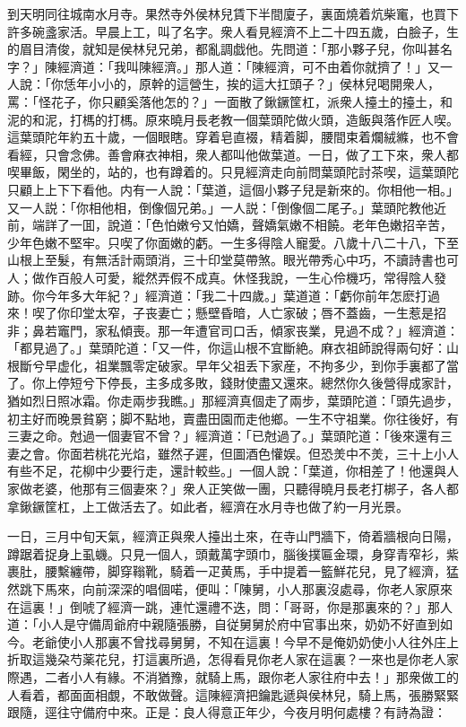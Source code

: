 到天明同往城南水月寺。果然寺外侯林兒賃下半間廈子，裏面燒着炕柴竃，也買下許多碗盞家活。早晨上工，叫了名字。衆人看見經濟不上二十四五歲，白臉子，生的眉目清俊，就知是侯林兒兄弟，都亂調戯他。先問道：「那小夥子兒，你叫甚名字？」陳經濟道：「我叫陳經濟。」那人道：「陳經濟，可不由着你就擠了！」又一人說：「你恁年小小的，原幹的這營生，挨的這大扛頭子？」侯林兒喝開衆人，罵：「怪花子，你只顧奚落他怎的？」一面散了鍬鐝筐杠，派衆人擡土的擡土，和泥的和泥，打榪的打榪。原來曉月長老教一個葉頭陀做火頭，造飯與落作匠人喫。這葉頭陀年約五十歲，一個眼瞎。穿着皂直裰，精着脚，腰間束着爛絨縧，也不會看經，只會念佛。善會麻衣神相，衆人都叫他做葉道。一日，做了工下來，衆人都喫畢飯，閑坐的，站的，也有蹲着的。只見經濟走向前問葉頭陀討茶喫，這葉頭陀只顧上上下下看他。内有一人說：「葉道，這個小夥子兒是新來的。你相他一相。」又一人説：「你相他相，倒像個兄弟。」一人説：「倒像個二尾子。」葉頭陀教他近前，端詳了一囬，說道：「色怕嫩兮又怕嬌，聲嬌氣嫩不相饒。老年色嫩招辛苦，少年色嫩不堅牢。只喫了你面嫩的虧。一生多得陰人寵愛。八歲十八二十八，下至山根上至髮，有無活計兩頭消，三十印堂莫帶煞。眼光帶秀心中巧，不讀詩書也可人；做作百般人可愛，縱然弄假不成真。休怪我說，一生心伶機巧，常得陰人發跡。你今年多大年紀？」經濟道：「我二十四歲。」葉道道：「虧你前年怎麽打過來！喫了你印堂太窄，子丧妻亡；懸壁昏暗，人亡家破；唇不蓋齒，一生惹是招非；鼻若竈門，家私傾喪。那一年遭官司口舌，傾家丧業，見過不成？」經濟道：「都見過了。」葉頭陀道：「又一件，你這山根不宜斷絶。麻衣祖師說得兩句好：山根斷兮早虚化，祖業飄零定破家。早年父祖丢下家産，不拘多少，到你手裏都了當了。你上停短兮下停長，主多成多敗，錢財使盡又還來。總然你久後營得成家計，猶如烈日照冰霜。你走兩步我瞧。」那經濟真個走了兩步，葉頭陀道：「頭先過步，初主好而晚景貧窮；脚不點地，賣盡田園而走他鄉。一生不守祖業。你往後好，有三妻之命。尅過一個妻官不曾？」經濟道：「已尅過了。」葉頭陀道：「後來還有三妻之會。你面若桃花光焰，雖然子遲，但圖酒色懽娱。但恐羙中不羙，三十上小人有些不足，花柳中少要行走，還計較些。」一個人說：「葉道，你相差了！他還與人家做老婆，他那有三個妻來？」衆人正笑做一團，只聽得曉月長老打梆子，各人都拿鍬鐝筐杠，上工做活去了。如此者，經濟在水月寺也做了約一月光景。

一日，三月中旬天氣，經濟正與衆人擡出土來，在寺山門牆下，倚着牆根向日陽，蹲踞着捉身上虱蟣。只見一個人，頭戴萬字頭巾，腦後撲匾金環，身穿青窄衫，紫裹肚，腰繫纏帶，脚穿䩺靴，騎着一疋黄馬，手中提着一籃鮮花兒，見了經濟，猛然跳下馬來，向前深深的唱個喏，便叫：「陳舅，小人那裏沒處尋，你老人家原來在這裏！」倒唬了經濟一跳，連忙還禮不迭，問：「哥哥，你是那裏來的？」那人道：「小人是守備周爺府中親隨張勝，自従舅舅於府中官事出來，奶奶不好直到如今。老爺使小人那裏不曾找尋舅舅，不知在這裏！今早不是俺奶奶使小人往外庄上折取這幾朶芍薬花兒，打這裏所過，怎得看見你老人家在這裏？一來也是你老人家際遇，二者小人有緣。不消猶豫，就騎上馬，跟你老人家往府中去！」那衆做工的人看着，都面面相覷，不敢做聲。這陳經濟把鑰匙遞與侯林兒，騎上馬，張勝緊緊跟隨，逕往守備府中來。正是：良人得意正年少，今夜月明何處樓？有詩為證：

